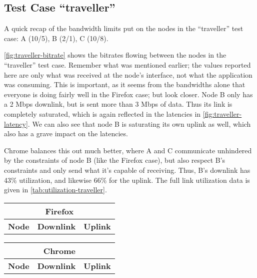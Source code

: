 \subsection{Test Case ``traveller''}

A quick recap of the bandwidth limits put on the nodes in the ``traveller'' test case: A (10/5), B (2/1), C (10/8).

\autoref{fig:traveller-bitrate} shows the bitrates flowing between the nodes in the ``traveller'' test case. Remember what was mentioned earlier; the values reported here are only what was received at the node's interface, not what the application was consuming. This is important, as it seems from the bandwidths alone that everyone is doing fairly well in the Firefox case; but look closer. Node B only has a 2 Mbps downlink, but is sent more than 3 Mbps of data. Thus its link is completely saturated, which is again reflected in the latencies in \autoref{fig:traveller-latency}. We can also see that node B is saturating its own uplink as well, which also has a grave impact on the latencies.

Chrome balances this out much better, where A and C communicate unhindered by the constraints of node B (like the Firefox case), but also respect B's constraints and only send what it's capable of receiving. Thus, B's downlink has 43\% utilization, and likewise 66\% for the uplink. The full link utilization data is given in \autoref{tab:utilization-traveller}.

\begin{center}
    \label{tab:utilization-traveller}
    \begin{tabular}{| l | l | l |}
    \multicolumn{3}{c}{\textbf{Firefox}} \\ \hline
    \textbf{Node} & \textbf{Downlink} & \textbf{Uplink} \\ \hline
    
    \hline
    \end{tabular}
    \hfill
    \begin{tabular}{| l | l | l |}
    \multicolumn{3}{c}{\textbf{Chrome}} \\ \hline
    \textbf{Node} & \textbf{Downlink} & \textbf{Uplink} \\ \hline
    
    \hline
    \end{tabular}
\end{center}


